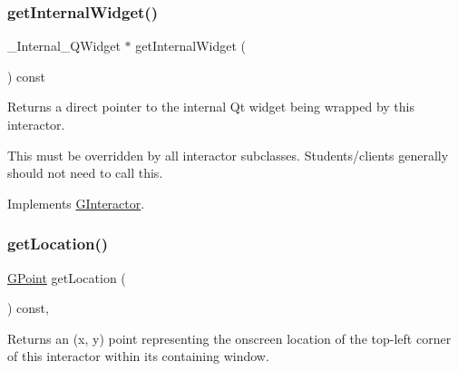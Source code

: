 \mbox{\label{classGContainer_a208ce13c1da40bf0ddb509daf99d6588}} 
\subsubsection{\texorpdfstring{get\+Internal\+Widget()}{getInternalWidget()}}
{\footnotesize\ttfamily \+\_\+\+Internal\+\_\+\+Q\+Widget $\ast$ get\+Internal\+Widget (\begin{DoxyParamCaption}{ }\end{DoxyParamCaption}) const\hspace{0.3cm}{\ttfamily [virtual]}}



Returns a direct pointer to the internal Qt widget being wrapped by this interactor. 

This must be overridden by all interactor subclasses. Students/clients generally should not need to call this. 

Implements \mbox{\hyperlink{classGInteractor}{G\+Interactor}}.

\mbox{\label{classGInteractor_a4f83802015511edeb63b892830812c11}} 
\subsubsection{\texorpdfstring{get\+Location()}{getLocation()}}
{\footnotesize\ttfamily \mbox{\hyperlink{classGPoint}{G\+Point}} get\+Location (\begin{DoxyParamCaption}{ }\end{DoxyParamCaption}) const\hspace{0.3cm}{\ttfamily [virtual]}, {\ttfamily [inherited]}}



Returns an (x, y) point representing the onscreen location of the top-\/left corner of this interactor within its containing window. 

\mbox{\label{classGContainer_ae2b63e249b9251e1893dae87aaf4cc3d}} 
